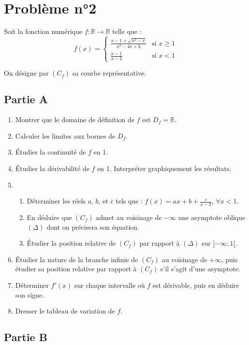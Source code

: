 \documentclass[12pt]{article}
\begin{document}
\section*{Problème n°2}

Soit la fonction numérique \( f : \mathbb{R} \to \mathbb{R} \) telle que :
\[
f(x) = 
\begin{cases} 
\frac{x - 1 + \sqrt{x^2 - x}}{x^2 - 4x + 3} & \text{si } x \geq 1 \\
\frac{x - 1}{x - 2} & \text{si } x < 1 
\end{cases}
\]

On désigne par \( (C_f) \) sa courbe représentative.

\subsection*{Partie A}

\begin{enumerate}
    \item Montrer que le domaine de définition de $f$ est $D_f = \mathbb{R}$.
    \item Calculer les limites aux bornes de $D_f$.
    \item Étudier la continuité de $f$ en 1.
    \item Étudier la dérivabilité de $f$ en 1. Interpréter graphiquement les résultats.
    \item 
    \begin{enumerate}
        \item Déterminer les réels $a$, $b$, et $c$ tels que : $f(x) = ax + b + \frac{c}{x-2}$, $\forall x < 1$.
        \item En déduire que $(C_f)$ admet au voisinage de $-\infty$ une asymptote oblique $(\Delta)$ dont on précisera son équation.
        \item Étudier la position relative de $(C_f)$ par rapport à $(\Delta)$ sur ]$-\infty ; 1[$.
    \end{enumerate}
    \item Étudier la nature de la branche infinie de $(C_f)$ au voisinage de $+\infty$, puis étudier sa position relative par rapport à $(C_f)$ s'il s'agit d'une asymptote.
    \item Déterminer $f'(x)$ sur chaque intervalle où $f$ est dérivable, puis en déduire son signe.
    \item Dresser le tableau de variation de $f$.
\end{enumerate}

\subsection*{Partie B}
\end{document}
